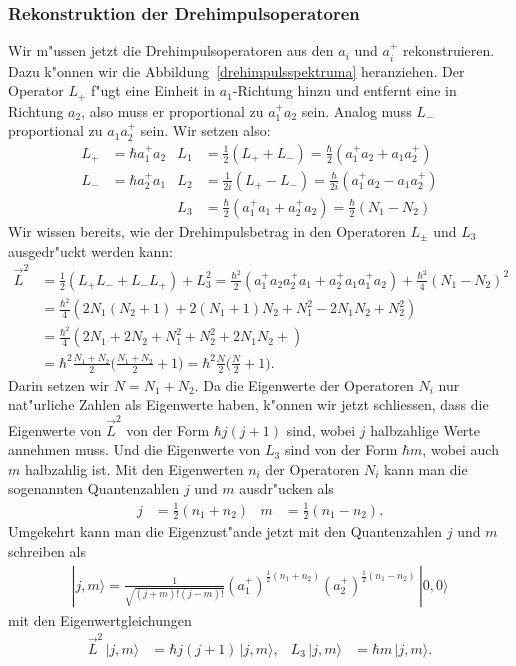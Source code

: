 \subsubsection{Rekonstruktion der Drehimpulsoperatoren}
Wir m"ussen jetzt die Drehimpulsoperatoren aus den $a_i$ und $a_i^+$
rekonstruieren.
Dazu k"onnen wir die Abbildung~\ref{drehimpulsspektruma} heranziehen.
Der Operator $L_+$ f"ugt eine Einheit in $a_1$-Richtung hinzu und
entfernt eine in Richtung $a_2$, also muss er proportional zu
$a_1^+a_2$ sein.
Analog muss $L_-$ proportional zu $a_1a_2^+$ sein. Wir setzen also:
\begin{align*}
L_+
&=
\hbar a_1^+a_2
&
L_1
&=
\frac12(L_++L_-)
=
\frac{\hbar}2(a_1^+a_2+a_1a_2^+)
\\
L_-
&=
\hbar a_2^+a_1
&
L_2
&=
\frac1{2i}(L_+-L_-)
=
\frac{\hbar}{2i}(a_1^+a_2-a_1a_2^+)
\\
&&
L_3
&=
\frac{\hbar}2(a_1^+a_1+a_2^+a_2)
=
\frac{\hbar}2(N_1-N_2)
\end{align*}
Wir wissen bereits, wie der Drehimpulsbetrag in den Operatoren 
$L_\pm$ und $L_3$ ausgedr"uckt werden kann:
\begin{align*}
\vec L^2
&=
\frac12(L_+L_-+L_-L_+)+L_3^2
=
\frac{\hbar^2}2(a_1^+a_2a_2^+a_1+a_2^+a_1a_1^+a_2)+\frac{\hbar^2}{4}(N_1-N_2)^2
\\
&=
\frac{\hbar^2}4(
2N_1(N_2+1)+2(N_1+1)N_2
+N_1^2-2N_1N_2+N_2^2
)
\\
&=
\frac{\hbar^2}{4}(
2N_1+2N_2
+
N_1^2+N_2^2
+2N_1N_2
+
)
\\
&=
\hbar^2\frac{N_1+N_2}2\biggl(\frac{N_1+N_2}2+1\biggr)
=
\hbar^2\frac{N}2\biggl(\frac{N}2+1\biggr).
\end{align*}
Darin setzen wir $N=N_1+N_2$. Da die Eigenwerte der Operatoren $N_i$
nur nat"urliche Zahlen als Eigenwerte haben, k"onnen wir jetzt schliessen,
dass die Eigenwerte von $\vec L^2$ von der Form $\hbar j(j+1)$ sind,
wobei $j$ halbzahlige Werte annehmen muss.
Und die Eigenwerte von $L_3$ sind von der Form $\hbar m$, wobei auch
$m$ halbzahlig ist.
Mit den Eigenwerten $n_i$ der Operatoren $N_i$ kann man die sogenannten
Quantenzahlen $j$ und $m$ ausdr"ucken als
\begin{align*}
j
&=
\frac12(n_1+n_2)
&
m
&=
\frac12(n_1-n_2).
\end{align*}
Umgekehrt kann man die Eigenzust"ande jetzt mit den Quantenzahlen $j$ und $m$
schreiben als
\begin{align*}
|j,m\rangle
=
\frac1{\sqrt{(j+m)!(j-m)!}}
(a_1^+)^{\frac12(n_1+n_2)}
(a_2^+)^{\frac12(n_1-n_2)}
\,|0,0\rangle
\end{align*}
mit den Eigenwertgleichungen
\begin{align*}
\vec L^2\,|j,m\rangle&=\hbar j(j+1)\,|j,m\rangle,
&
L_3\,|j,m\rangle&=\hbar m\,|j,m\rangle.
\end{align*}

